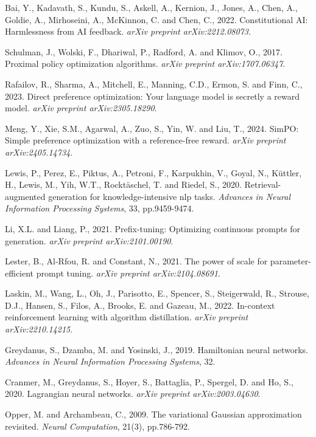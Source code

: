 \documentclass[11pt,a4paper]{article}
\begin{document}
\begin{thebibliography}{99}
Bai, Y., Kadavath, S., Kundu, S., Askell, A., Kernion, J., Jones, A., Chen, A., Goldie, A., Mirhoseini, A., McKinnon, C. and Chen, C., 2022. Constitutional AI: Harmlessness from AI feedback. \textit{arXiv preprint arXiv:2212.08073}.

Schulman, J., Wolski, F., Dhariwal, P., Radford, A. and Klimov, O., 2017. Proximal policy optimization algorithms. \textit{arXiv preprint arXiv:1707.06347}.

Rafailov, R., Sharma, A., Mitchell, E., Manning, C.D., Ermon, S. and Finn, C., 2023. Direct preference optimization: Your language model is secretly a reward model. \textit{arXiv preprint arXiv:2305.18290}.

Meng, Y., Xie, S.M., Agarwal, A., Zuo, S., Yin, W. and Liu, T., 2024. SimPO: Simple preference optimization with a reference-free reward. \textit{arXiv preprint arXiv:2405.14734}.

Lewis, P., Perez, E., Piktus, A., Petroni, F., Karpukhin, V., Goyal, N., Küttler, H., Lewis, M., Yih, W.T., Rocktäschel, T. and Riedel, S., 2020. Retrieval-augmented generation for knowledge-intensive nlp tasks. \textit{Advances in Neural Information Processing Systems}, 33, pp.9459-9474.

Li, X.L. and Liang, P., 2021. Prefix-tuning: Optimizing continuous prompts for generation. \textit{arXiv preprint arXiv:2101.00190}.

Lester, B., Al-Rfou, R. and Constant, N., 2021. The power of scale for parameter-efficient prompt tuning. \textit{arXiv preprint arXiv:2104.08691}.

Laskin, M., Wang, L., Oh, J., Parisotto, E., Spencer, S., Steigerwald, R., Strouse, D.J., Hansen, S., Filos, A., Brooks, E. and Gazeau, M., 2022. In-context reinforcement learning with algorithm distillation. \textit{arXiv preprint arXiv:2210.14215}.

Greydanus, S., Dzamba, M. and Yosinski, J., 2019. Hamiltonian neural networks. \textit{Advances in Neural Information Processing Systems}, 32.

Cranmer, M., Greydanus, S., Hoyer, S., Battaglia, P., Spergel, D. and Ho, S., 2020. Lagrangian neural networks. \textit{arXiv preprint arXiv:2003.04630}.

Opper, M. and Archambeau, C., 2009. The variational Gaussian approximation revisited. \textit{Neural Computation}, 21(3), pp.786-792.


\end{thebibliography}
\end{document}
